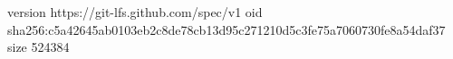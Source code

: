 version https://git-lfs.github.com/spec/v1
oid sha256:c5a42645ab0103eb2c8de78cb13d95c271210d5c3fe75a7060730fe8a54daf37
size 524384

